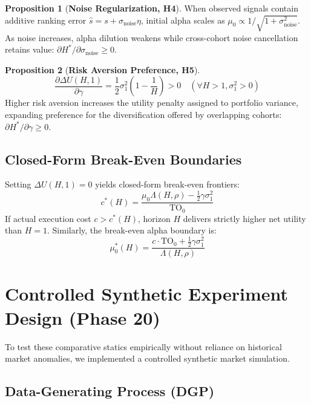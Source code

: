 \documentclass[11pt,a4paper]{article}
\theoremstyle{definition}
\newtheorem{proposition}{Proposition}
\begin{document}
\begin{proposition}[\textbf{Noise Regularization, H4}]
When observed signals contain additive ranking error $\hat{s} = s + \sigma_{\text{noise}}\eta$, initial alpha scales as $\mu_0 \propto 1 / \sqrt{1 + \sigma_{\text{noise}}^2}$. As noise increases, alpha dilution weakens while cross-cohort noise cancellation retains value: $\partial H^* / \partial \sigma_{\text{noise}} \ge 0$.
\end{proposition}

\begin{proposition}[\textbf{Risk Aversion Preference, H5}]
\begin{equation}
\frac{\partial \Delta U(H, 1)}{\partial \gamma} = \frac{1}{2}\sigma_1^2 \left(1 - \frac{1}{H}\right) > 0 \quad (\forall H > 1, \sigma_1^2 > 0)
\end{equation}
Higher risk aversion increases the utility penalty assigned to portfolio variance, expanding preference for the diversification offered by overlapping cohorts: $\partial H^* / \partial \gamma \ge 0$.
\end{proposition}

\subsection{Closed-Form Break-Even Boundaries}
Setting $\Delta U(H, 1) = 0$ yields closed-form break-even frontiers:
\begin{equation}
c^*(H) = \frac{\mu_0 \Lambda(H, \rho) - \frac{1}{2}\gamma \sigma_1^2}{\text{TO}_0}
\end{equation}
If actual execution cost $c > c^*(H)$, horizon $H$ delivers strictly higher net utility than $H=1$. Similarly, the break-even alpha boundary is:
\begin{equation}
\mu_0^*(H) = \frac{c \cdot \text{TO}_0 + \frac{1}{2}\gamma \sigma_1^2}{\Lambda(H, \rho)}
\end{equation}


\section{Controlled Synthetic Experiment Design (Phase 20)}
\label{sec:design}

To test these comparative statics empirically without reliance on historical market anomalies, we implemented a controlled synthetic market simulation.

\subsection{Data-Generating Process (DGP)}
\end{document}
